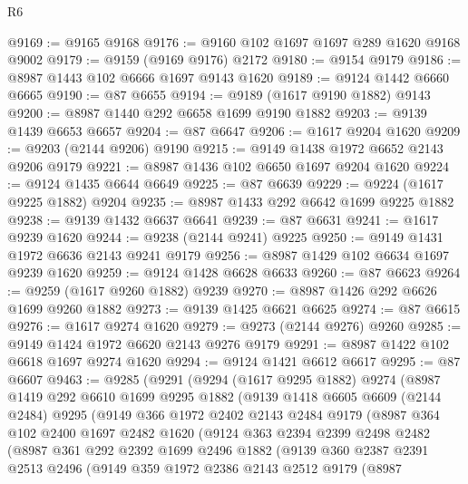 \begin{lexlean}{R6}
\begin{coremodule}
@9169 := @9165 @9168
@9176 := @9160 @102 @1697 @1697 @289 @1620 @9168 @9002
@9179 := @9159 (@9169 @9176) @2172
@9180 := @9154 @9179
@9186 := @8987 @1443 @102 @6666 @1697 @9143 @1620
@9189 := @9124 @1442 @6660 @6665
@9190 := @87 @6655
@9194 := @9189 (@1617 @9190 @1882) @9143
@9200 := @8987 @1440 @292 @6658 @1699 @9190 @1882
@9203 := @9139 @1439 @6653 @6657
@9204 := @87 @6647
@9206 := @1617 @9204 @1620
@9209 := @9203 (@2144 @9206) @9190
@9215 := @9149 @1438 @1972 @6652 @2143 @9206 @9179
@9221 := @8987 @1436 @102 @6650 @1697 @9204 @1620
@9224 := @9124 @1435 @6644 @6649
@9225 := @87 @6639
@9229 := @9224 (@1617 @9225 @1882) @9204
@9235 := @8987 @1433 @292 @6642 @1699 @9225 @1882
@9238 := @9139 @1432 @6637 @6641
@9239 := @87 @6631
@9241 := @1617 @9239 @1620
@9244 := @9238 (@2144 @9241) @9225
@9250 := @9149 @1431 @1972 @6636 @2143 @9241 @9179
@9256 := @8987 @1429 @102 @6634 @1697 @9239 @1620
@9259 := @9124 @1428 @6628 @6633
@9260 := @87 @6623
@9264 := @9259 (@1617 @9260 @1882) @9239
@9270 := @8987 @1426 @292 @6626 @1699 @9260 @1882
@9273 := @9139 @1425 @6621 @6625
@9274 := @87 @6615
@9276 := @1617 @9274 @1620
@9279 := @9273 (@2144 @9276) @9260
@9285 := @9149 @1424 @1972 @6620 @2143 @9276 @9179
@9291 := @8987 @1422 @102 @6618 @1697 @9274 @1620
@9294 := @9124 @1421 @6612 @6617
@9295 := @87 @6607
@9463 := @9285
    (@9291
      (@9294
        (@1617 @9295 @1882)
        @9274
        (@8987
          @1419
          @292
          @6610
          @1699
          @9295
          @1882
          (@9139
            @1418
            @6605
            @6609
            (@2144 @2484)
            @9295
            (@9149
              @366
              @1972
              @2402
              @2143
              @2484
              @9179
              (@8987
                @364
                @102
                @2400
                @1697
                @2482
                @1620
                (@9124
                  @363
                  @2394
                  @2399
                  @2498
                  @2482
                  (@8987
                    @361
                    @292
                    @2392
                    @1699
                    @2496
                    @1882
                    (@9139
                      @360
                      @2387
                      @2391
                      @2513
                      @2496
                      (@9149
                        @359
                        @1972
                        @2386
                        @2143
                        @2512
                        @9179
                        (@8987

\end{coremodule}
\end{lexlean}
